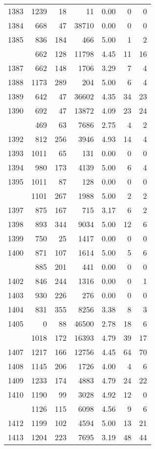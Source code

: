 \documentclass[
]{article}
\begin{document}
\begin{table}
\begin{tabular}[t]{lrrrrrr}
1383 & 1239 & 18 & 11 & 0.00 & 0 & 0\\
1384 & 668 & 47 & 38710 & 0.00 & 0 & 0\\
1385 & 836 & 184 & 466 & 5.00 & 1 & 2\\
\addlinespace
1386 & 662 & 128 & 11798 & 4.45 & 11 & 16\\
1387 & 662 & 148 & 1706 & 3.29 & 7 & 4\\
1388 & 1173 & 289 & 204 & 5.00 & 6 & 4\\
1389 & 642 & 47 & 36602 & 4.35 & 34 & 23\\
1390 & 692 & 47 & 13872 & 4.09 & 23 & 24\\
\addlinespace
1391 & 469 & 63 & 7686 & 2.75 & 4 & 2\\
1392 & 812 & 256 & 3946 & 4.93 & 14 & 4\\
1393 & 1011 & 65 & 131 & 0.00 & 0 & 0\\
1394 & 980 & 173 & 4139 & 5.00 & 6 & 4\\
1395 & 1011 & 87 & 128 & 0.00 & 0 & 0\\
\addlinespace
1396 & 1101 & 267 & 1988 & 5.00 & 2 & 2\\
1397 & 875 & 167 & 715 & 3.17 & 6 & 2\\
1398 & 893 & 344 & 9034 & 5.00 & 12 & 6\\
1399 & 750 & 25 & 1417 & 0.00 & 0 & 0\\
1400 & 871 & 107 & 1614 & 5.00 & 5 & 6\\
\addlinespace
1401 & 885 & 201 & 441 & 0.00 & 0 & 0\\
1402 & 846 & 244 & 1316 & 0.00 & 0 & 1\\
1403 & 930 & 226 & 276 & 0.00 & 0 & 0\\
1404 & 831 & 355 & 8256 & 3.38 & 8 & 3\\
1405 & 0 & 88 & 46500 & 2.78 & 18 & 6\\
\addlinespace
1406 & 1018 & 172 & 16393 & 4.79 & 39 & 17\\
1407 & 1217 & 166 & 12756 & 4.45 & 64 & 70\\
1408 & 1145 & 206 & 1726 & 4.00 & 4 & 6\\
1409 & 1233 & 174 & 4883 & 4.79 & 24 & 22\\
1410 & 1190 & 99 & 3028 & 4.92 & 12 & 0\\
\addlinespace
1411 & 1126 & 115 & 6098 & 4.56 & 9 & 6\\
1412 & 1199 & 102 & 4594 & 5.00 & 13 & 21\\
1413 & 1204 & 223 & 7695 & 3.19 & 48 & 44\\

\end{tabular}
\end{table}
\end{document}
